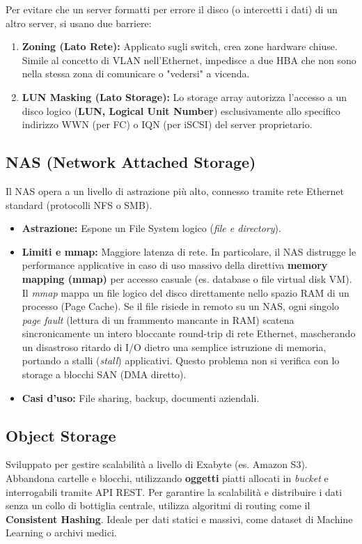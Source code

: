 \begin{tipbox}
Per evitare che un server formatti per errore il disco (o intercetti i dati) di un altro server, si usano due barriere:
\begin{enumerate}
    \item \textbf{Zoning (Lato Rete):} Applicato sugli switch, crea zone hardware chiuse. Simile al concetto di VLAN nell'Ethernet, impedisce a due HBA che non sono nella stessa zona di comunicare o "vedersi" a vicenda.
    \item \textbf{LUN Masking (Lato Storage):} Lo storage array autorizza l'accesso a un disco logico (\textbf{LUN, Logical Unit Number}) esclusivamente allo specifico indirizzo WWN (per FC) o IQN (per iSCSI) del server proprietario.
\end{enumerate}
\end{tipbox}

\subsection{NAS (Network Attached Storage)}
Il NAS opera a un livello di astrazione più alto, connesso tramite rete Ethernet standard (protocolli NFS o SMB).
\begin{itemize}
    \item \textbf{Astrazione:} Espone un File System logico (\textit{file e directory}).
    \item \textbf{Limiti e mmap:} Maggiore latenza di rete. In particolare, il NAS distrugge le performance applicative in caso di uso massivo della direttiva \textbf{memory mapping (mmap)} per accesso casuale (es. database o file virtual disk VM). Il \textit{mmap} mappa un file logico del disco direttamente nello spazio RAM di un processo (Page Cache). Se il file risiede in remoto su un NAS, ogni singolo \textit{page fault} (lettura di un frammento mancante in RAM) scatena sincronicamente un intero bloccante round-trip di rete Ethernet, mascherando un disastroso ritardo di I/O dietro una semplice istruzione di memoria, portando a stalli (\textit{stall}) applicativi. Questo problema non si verifica con lo storage a blocchi SAN (DMA diretto).
    \item \textbf{Casi d'uso:} File sharing, backup, documenti aziendali.
\end{itemize}

\subsection{Object Storage}
Sviluppato per gestire scalabilità a livello di Exabyte (es. Amazon S3). Abbandona cartelle e blocchi, utilizzando \textbf{oggetti} piatti allocati in \textit{bucket} e interrogabili tramite API REST.
Per garantire la scalabilità e distribuire i dati senza un collo di bottiglia centrale, utilizza algoritmi di routing come il \textbf{Consistent Hashing}. Ideale per dati statici e massivi, come dataset di Machine Learning o archivi medici.

